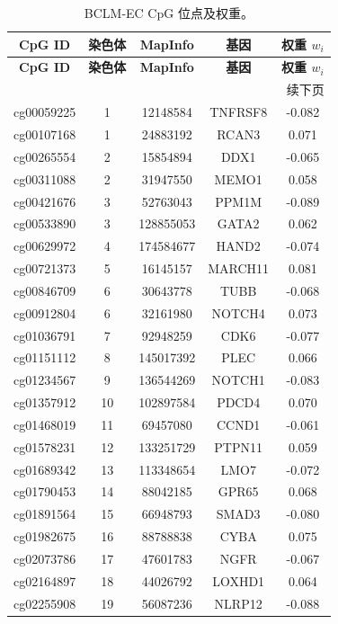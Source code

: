 \documentclass[12pt,a4paper,fontset=fandol]{ctexart}
\begin{document}
	\begin{longtable}{|c|c|c|c|c|}
		\caption{BCLM‑EC CpG 位点及权重。}\label{tab:cpgs}\\
		\hline
		\textbf{CpG ID} & \textbf{染色体} & \textbf{MapInfo} & \textbf{基因} & \textbf{权重 \(w_i\)} \\
		\hline
		\endfirsthead
		\hline
		\textbf{CpG ID} & \textbf{染色体} & \textbf{MapInfo} & \textbf{基因} & \textbf{权重 \(w_i\)} \\
		\hline
		\endhead
		\hline
		\multicolumn{5}{r}{续下页}\\
		\endfoot
		\hline
		\endlastfoot
		cg00059225 & 1 & 12148584 & TNFRSF8 & -0.082 \\
		cg00107168 & 1 & 24883192 & RCAN3 & 0.071 \\
		cg00265554 & 2 & 15854894 & DDX1 & -0.065 \\
		cg00311088 & 2 & 31947550 & MEMO1 & 0.058 \\
		cg00421676 & 3 & 52763043 & PPM1M & -0.089 \\
		cg00533890 & 3 & 128855053 & GATA2 & 0.062 \\
		cg00629972 & 4 & 174584677 & HAND2 & -0.074 \\
		cg00721373 & 5 & 16145157 & MARCH11 & 0.081 \\
		cg00846709 & 6 & 30643778 & TUBB & -0.068 \\
		cg00912804 & 6 & 32161980 & NOTCH4 & 0.073 \\
		cg01036791 & 7 & 92948259 & CDK6 & -0.077 \\
		cg01151112 & 8 & 145017392 & PLEC & 0.066 \\
		cg01234567 & 9 & 136544269 & NOTCH1 & -0.083 \\
		cg01357912 & 10 & 102897584 & PDCD4 & 0.070 \\
		cg01468019 & 11 & 69457080 & CCND1 & -0.061 \\
		cg01578231 & 12 & 133251729 & PTPN11 & 0.059 \\
		cg01689342 & 13 & 113348654 & LMO7 & -0.072 \\
		cg01790453 & 14 & 88042185 & GPR65 & 0.068 \\
		cg01891564 & 15 & 66948793 & SMAD3 & -0.080 \\
		cg01982675 & 16 & 88788838 & CYBA & 0.075 \\
		cg02073786 & 17 & 47601783 & NGFR & -0.067 \\
		cg02164897 & 18 & 44026792 & LOXHD1 & 0.064 \\
		cg02255908 & 19 & 56087236 & NLRP12 & -0.088 \\

\end{longtable}
\end{document}
